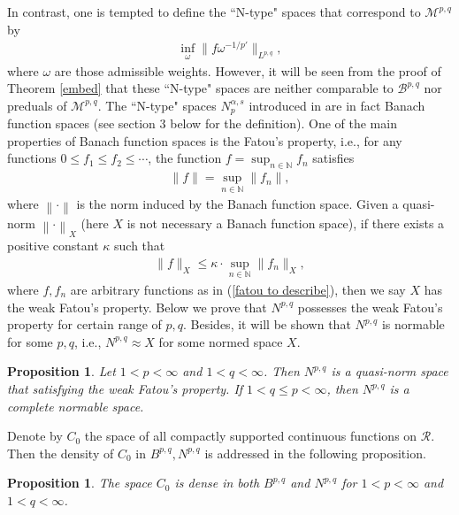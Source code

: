 \documentclass[10pt,reqno]{amsart}
\newtheorem{proposition}[theorem]{Proposition}
\numberwithin{equation}{section}
\begin{document}
In contrast, one is tempted to define the ``N-type" spaces that correspond to $\mathcal{M}^{p,q}$ by 
\begin{align*}
\inf_{\omega}\|f\omega^{-1/p'}\|_{L^{p,q}},
\end{align*}
where $\omega$ are those admissible weights. However, it will be seen from the proof of Theorem \ref{embed} that these ``N-type" spaces are neither comparable to $\mathcal{B}^{p,q}$ nor preduals of $\mathcal{M}^{p,q}$. The ``N-type" spaces $N_{p}^{\alpha,s}$ introduced in \cite{OP} are in fact Banach function spaces (see section $3$ below for the definition). One of the main properties of Banach function spaces is the Fatou's property, i.e., for any functions $0\leq f_{1}\leq f_{2}\leq\cdots$, the function $f=\sup_{n\in\mathbb{N}}f_{n}$ satisfies 
\begin{align}\label{fatou to describe}
\|f\|=\sup_{n\in\mathbb{N}}\|f_{n}\|,
\end{align}
where $\left\|\cdot\right\|$ is the norm induced by the Banach function space. Given a quasi-norm $\left\|\cdot\right\|_{X}$ (here $X$ is not necessary a Banach function space), if there exists a positive constant $\kappa$ such that 
\begin{align*}
\|f\|_{X}\leq\kappa\cdot\sup_{n\in\mathbb{N}}\|f_{n}\|_{X},
\end{align*}
where $f,f_{n}$ are arbitrary functions as in (\ref{fatou to describe}), then we say $X$ has the weak Fatou's property. Below we prove that $N^{p,q}$ possesses the weak Fatou's property for certain range of $p,q$. Besides, it will be shown that $N^{p,q}$ is normable for some $p,q$, i.e., $N^{p,q}\approx X$ for some normed space $X$.
\begin{proposition}\label{fatou property}
Let $1<p<\infty$ and $1<q<\infty$. Then $N^{p,q}$ is a quasi-norm space that satisfying the weak Fatou's property. If $1<q\leq p<\infty$, then $N^{p,q}$ is a complete normable space.
\end{proposition}

Denote by $C_{0}$ the space of all compactly supported continuous functions on $\mathcal{R}$. Then the density of $C_{0}$ in $B^{p,q},N^{p,q}$ is addressed in the following proposition.
\begin{proposition}\label{density}
The space $C_{0}$ is dense in both $B^{p,q}$ and $N^{p,q}$ for $1<p<\infty$ and $1<q<\infty$.
\end{proposition}
\end{document}
